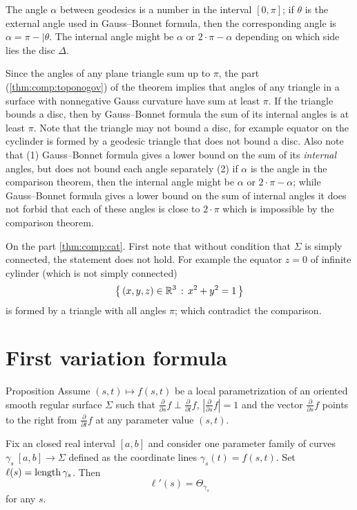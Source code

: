 The angle $\alpha$ between geodesics is a number in the interval $[0,\pi]$;
if $\theta$ is the external angle used in Gauss--Bonnet formula, then the corresponding angle is $\alpha=\pi-|\theta$.
The internal angle might be $\alpha$ or $2\cdot\pi-\alpha$ depending on which side lies the disc $\Delta$.

Since the angles of any plane triangle sum up to $\pi$,
the part (\ref{thm:comp:toponogov}) of the theorem implies that angles of any triangle in a surface with nonnegative Gauss curvature have sum at least $\pi$.
If the triangle bounds a disc, then by Gauss--Bonnet formula the sum of its internal angles is at least $\pi$.
Note that the triangle may not bound a disc, for example equator on the cyclinder is formed by a geodesic triangle that does not bound a disc.
Also note that (1) Gauss--Bonnet formula gives a lower bound on the sum of its \emph{internal} angles, but does not bound each angle separately (2) if $\alpha$ is the angle in the comparison theorem, then the internal angle might be $\alpha$ or $2\cdot\pi-\alpha$; while Gauss--Bonnet formula gives a lower bound on the sum of internal angles it does not forbid that each of these angles is close to $2\cdot \pi$ which is impossible by the comparison theorem.

On the part \ref{thm:comp:cat}.
First note that without condition that $\Sigma$ is simply connected, the statement does not hold.
For example the equator $z=0$ of infinite cylinder (which is not simply connected)
\[\left\{\,{(x,y,z)\in\mathbb{R}^3}\,:\,{x^2+y^2=1}\,\right\}\]
is formed by a triangle with all angles $\pi$; which contradict the comparison. 


\section{First variation formula}

\begin{thm}{Proposition}\label{prop:first-var}
Assume $(s,t)\mapsto f(s,t)$ be a local parametrization of an oriented smooth regular surface $\Sigma$ such that 
$\tfrac{\partial}{\partial s}f\perp \tfrac{\partial}{\partial t}f$, $|\tfrac{\partial}{\partial s}f|=1$ and the vector $\tfrac{\partial}{\partial s}f$ points to the right from $\tfrac{\partial}{\partial t}f$ at any parameter value $(s,t)$.

Fix an closed real interval $[a,b]$ and consider one parameter family of curves $\gamma_s\:[a,b]\to \Sigma$  defined as the coordinate lines $\gamma_s(t)=f(s,t)$.
Set $\ell(s)=\mathop{\rm length}\nolimits \gamma_s$.
Then
\[\ell'(s)=\Theta_{\gamma_s}\]
for any $s$.
\end{thm}

